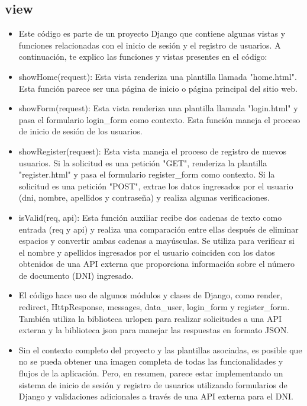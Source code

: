 \documentclass{article}
\begin{document}
\subsection{view}
\begin{itemize}	
	\item Este código es parte de un proyecto Django que contiene algunas vistas y funciones relacionadas con el inicio de sesión y el registro de usuarios. A continuación, te explico las funciones y vistas presentes en el código:
	\item showHome(request): Esta vista renderiza una plantilla llamada "home.html". Esta función parece ser una página de inicio o página principal del sitio web.

	\item showForm(request): Esta vista renderiza una plantilla llamada "login.html" y pasa el formulario login\_form como contexto. Esta función maneja el proceso de inicio de sesión de los usuarios.
	
	\item showRegister(request): Esta vista maneja el proceso de registro de nuevos usuarios. Si la solicitud es una petición "GET", renderiza la plantilla "register.html" y pasa el formulario register\_form como contexto. Si la solicitud es una petición "POST", extrae los datos ingresados por el usuario (dni, nombre, apellidos y contraseña) y realiza algunas verificaciones.
	
	\item isValid(req, api): Esta función auxiliar recibe dos cadenas de texto como entrada (req y api) y realiza una comparación entre ellas después de eliminar espacios y convertir ambas cadenas a mayúsculas. Se utiliza para verificar si el nombre y apellidos ingresados por el usuario coinciden con los datos obtenidos de una API externa que proporciona información sobre el número de documento (DNI) ingresado.
	
	\item El código hace uso de algunos módulos y clases de Django, como render, redirect, HttpResponse, messages, data\_user, login\_form y register\_form. También utiliza la biblioteca urlopen para realizar solicitudes a una API externa y la biblioteca json para manejar las respuestas en formato JSON.
	
	\item Sin el contexto completo del proyecto y las plantillas asociadas, es posible que no se pueda obtener una imagen completa de todas las funcionalidades y flujos de la aplicación. Pero, en resumen, parece estar implementando un sistema de inicio de sesión y registro de usuarios utilizando formularios de Django y validaciones adicionales a través de una API externa para el DNI.
	
\end{itemize}	
	
\end{document}
